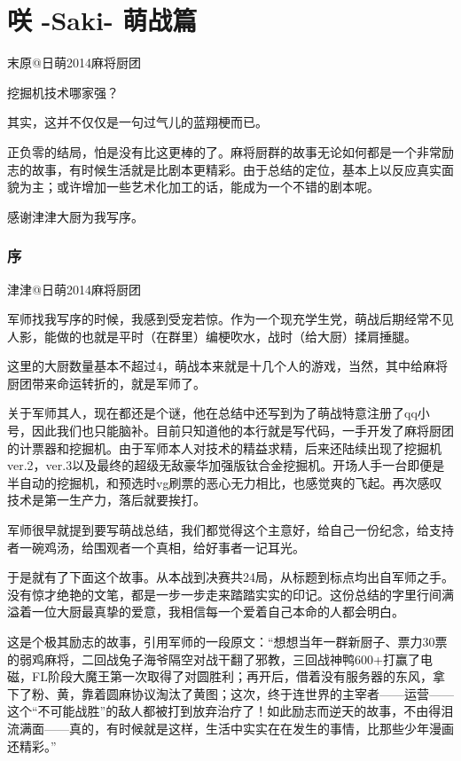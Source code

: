 
\part{咲 -Saki- 萌战篇}
\setcounter{section}{0}

末原@日萌2014麻将厨团

挖掘机技术哪家强？

其实，这并不仅仅是一句过气儿的蓝翔梗而已。

正负零的结局，怕是没有比这更棒的了。麻将厨群的故事无论如何都是一个非常励志的故事，有时候生活就是比剧本更精彩。由于总结的定位，基本上以反应真实面貌为主；或许增加一些艺术化加工的话，能成为一个不错的剧本呢。

感谢津津大厨为我写序。

\section*{序}

津津@日萌2014麻将厨团

军师找我写序的时候，我感到受宠若惊。作为一个现充学生党，萌战后期经常不见人影，能做的也就是平时（在群里）编梗吹水，战时（给大厨）揉肩捶腿。

这里的大厨数量基本不超过4，萌战本来就是十几个人的游戏，当然，其中给麻将厨团带来命运转折的，就是军师了。

关于军师其人，现在都还是个谜，他在总结中还写到为了萌战特意注册了qq小号，因此我们也只能脑补。目前只知道他的本行就是写代码，一手开发了麻将厨团的计票器和挖掘机。由于军师本人对技术的精益求精，后来还陆续出现了挖掘机ver.2，ver.3以及最终的超级无敌豪华加强版钛合金挖掘机。开场人手一台即便是半自动的挖掘机，和预选时vg刷票的恶心无力相比，也感觉爽的飞起。再次感叹技术是第一生产力，落后就要挨打。

军师很早就提到要写萌战总结，我们都觉得这个主意好，给自己一份纪念，给支持者一碗鸡汤，给围观者一个真相，给好事者一记耳光。

于是就有了下面这个故事。从本战到决赛共24局，从标题到标点均出自军师之手。没有惊才绝艳的文笔，都是一步一步走来踏踏实实的印记。这份总结的字里行间满溢着一位大厨最真挚的爱意，我相信每一个爱着自己本命的人都会明白。

这是个极其励志的故事，引用军师的一段原文：“想想当年一群新厨子、票力30票的弱鸡麻将，二回战兔子海爷隔空对战干翻了邪教，三回战神鸭600+打赢了电磁，FL阶段大魔王第一次取得了对圆胜利；再开后，借着没有服务器的东风，拿下了粉、黄，靠着圆麻协议淘汰了黄图；这次，终于连世界的主宰者——运营——这个“不可能战胜”的敌人都被打到放弃治疗了！如此励志而逆天的故事，不由得泪流满面——真的，有时候就是这样，生活中实实在在发生的事情，比那些少年漫画还精彩。”

